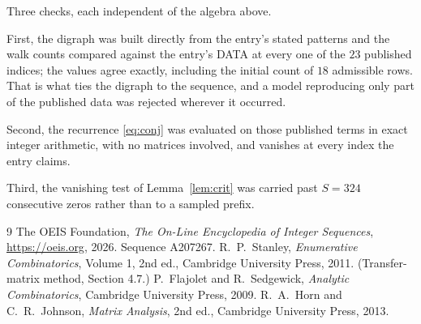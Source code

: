 \documentclass[11pt,a4paper]{article}
\theoremstyle{plain}
\theoremstyle{definition}
\begin{document}
Three checks, each independent of the algebra above.

First, the digraph was built directly from the entry's stated patterns and the walk counts
compared against the entry's DATA at every one of the $23$ published indices; the
values agree exactly, including the initial count of $18$ admissible rows. That is
what ties the digraph to the sequence, and a model reproducing only part of the published
data was rejected wherever it occurred.

Second, the recurrence \eqref{eq:conj} was evaluated on those published terms in exact
integer arithmetic, with no matrices involved, and vanishes at every index the entry claims.

Third, the vanishing test of Lemma~\ref{lem:crit} was carried past $S=324$ consecutive
zeros rather than to a sampled prefix.

\begin{thebibliography}{9}
 The OEIS Foundation, \emph{The On-Line Encyclopedia of Integer
Sequences}, \url{https://oeis.org}, 2026. Sequence A207267.
 R.~P.~Stanley, \emph{Enumerative Combinatorics}, Volume 1, 2nd ed.,
Cambridge University Press, 2011. (Transfer-matrix method, Section 4.7.)
 P.~Flajolet and R.~Sedgewick, \emph{Analytic Combinatorics}, Cambridge
University Press, 2009.
 R.~A.~Horn and C.~R.~Johnson, \emph{Matrix Analysis}, 2nd ed., Cambridge
University Press, 2013.
\end{thebibliography}
\end{document}
